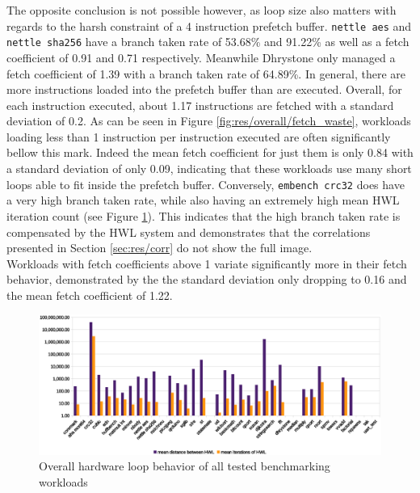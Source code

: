 \documentclass[../bachelor_paper.tex]{subfiles}
\begin{document}
The opposite conclusion is not possible however, as loop size also matters with regards to the harsh constraint of a 4 instruction prefetch buffer. \texttt{nettle aes} and \texttt{nettle sha256} have a branch taken rate of 53.68\% and 91.22\% as well as a fetch coefficient of 0.91 and 0.71 respectively. Meanwhile Dhrystone only managed a fetch coefficient of 1.39 with a branch taken rate of 64.89\%. In general, there are more instructions loaded into the prefetch buffer than are executed. Overall, for each instruction executed, about 1.17 instructions are fetched with a standard deviation of 0.2. As can be seen in Figure \ref{fig:res/overall/fetch_waste}, workloads loading less than 1 instruction per instruction executed are often significantly bellow this mark. Indeed the mean fetch coefficient for just them is only 0.84 with a standard deviation of only 0.09, indicating that these workloads use many short loops able to fit inside the prefetch buffer. Conversely, \texttt{embench crc32} does have a very high branch taken rate, while also having an extremely high mean \ac{HWL} iteration count (see Figure \ref{fig:res/overall/hwl}). This indicates that the high branch taken rate is compensated by the \ac{HWL} system and demonstrates that the correlations presented in Section \ref{sec:res/corr} do not show the full image.\\
Workloads with fetch coefficients above 1 variate significantly more in their fetch behavior, demonstrated by the the standard deviation only dropping to 0.16 and the mean fetch coefficient of 1.22.




\begin{figure}
    \centering
    \includegraphics[width=\textwidth]{img/graph/overall_hwl.eps}
    \caption{Overall hardware loop behavior of all tested benchmarking workloads}
    \label{fig:res/overall/hwl}
\end{figure}
\end{document}
